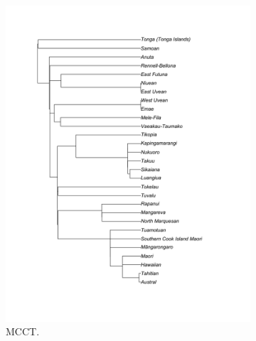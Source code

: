 \documentclass[12pt,letterpaper]{article}
\begin{document}
\begin{figure}[ht]
    \begin{subfigure}{0.5\linewidth}
          \includegraphics[width=\textwidth]{illustrations/plots_from_R/tree_plots/poly_tree_example_brlen_gray.png}
    \caption{\citet{grayetal_2009} MCCT.}
     \label{gray_tree_branch_example}
    \end{subfigure}
\hfil
    \begin{subfigure}{0.5\linewidth}

\end{subfigure}
\end{figure}
\end{document}
